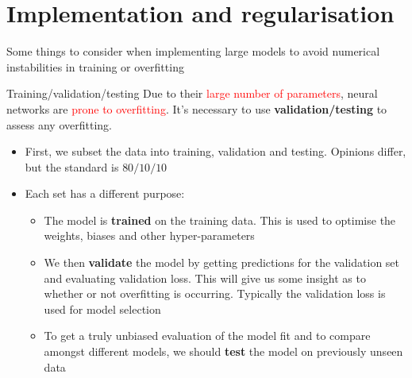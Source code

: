 \documentclass{beamer}
\begin{document}
\section{Implementation and regularisation}
\begin{frame}
\begin{center}
\item Some things to consider when implementing large models to avoid numerical instabilities in training or overfitting
\end{center}
\end{frame}
\begin{frame}{Training/validation/testing}
Due to their \textcolor{red}{large number of parameters}, neural networks are \textcolor{red}{prone to overfitting}. It's necessary to use \textbf{validation/testing} to assess any overfitting.
\begin{itemize}
\item First, we subset the data into training, validation and testing. Opinions differ, but the standard is $80/10/10$
\item Each set has a different purpose:
\begin{itemize}
\item The model is \textbf{trained} on the training data. This is used to optimise the weights, biases and other hyper-parameters
\item We then \textbf{validate} the model by getting predictions for the validation set and evaluating validation loss. This will give us some insight as to whether or not overfitting is occurring. Typically the validation loss is used for model selection
\item To get a truly unbiased evaluation of the model fit and to compare amongst different models, we should \textbf{test} the model on  previously unseen data
\end{itemize}
\end{itemize}
\end{frame}
\end{document}
